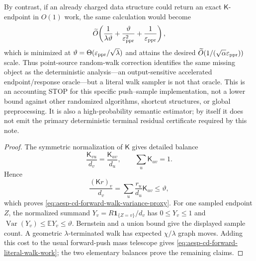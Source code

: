 \begin{proposition}
By contrast, if an already charged data structure could return an exact
\(\mathsf K\)-endpoint in \(O(1)\) work, the same calculation would become
\begin{equation*}
 \widetilde O\!\left(
   \frac1{\lambda\vartheta}
  +\frac{\vartheta}{\varepsilon_{\mathrm{ppr}}^2}
  +\frac1{\varepsilon_{\mathrm{ppr}}}
 \right),
\end{equation*}
which is minimized at
\(\vartheta=\Theta(\varepsilon_{\mathrm{ppr}}/\sqrt\lambda)\) and attains the desired
\(\widetilde O(1/(\sqrt\alpha\varepsilon_{\mathrm{ppr}}))\) scale.  Thus point-source
random-walk correction identifies the same missing object as the deterministic
analysis---an output-sensitive accelerated endpoint/response oracle---but a
literal walk sampler is not that oracle.  This is an accounting STOP for this
specific push--sample implementation, not a lower bound against other
randomized algorithms, shortcut structures, or global preprocessing.  It is
also a high-probability semantic estimator; by itself it does not emit the
primary deterministic terminal residual certificate required by this note.
\end{proposition}

\begin{proof}
The symmetric normalization of \(\mathsf K\) gives detailed balance
\begin{equation*}
 \frac{\mathsf K_{vu}}{d_v}=\frac{\mathsf K_{uv}}{d_u},
 \qquad
 \sum_u\mathsf K_{uv}=1.
\end{equation*}
Hence
\begin{equation*}
 \frac{(\mathsf K r)_v}{d_v}
 =\sum_u\frac{r_u}{d_u}\mathsf K_{uv}
 \leq\vartheta,
\end{equation*}
which proves \cref{eq:aesp-cd-forward-walk-variance-proxy}.  For one sampled
endpoint \(Z\), the normalized summand
\(Y_v=R\mathbf1_{\{Z=v\}}/d_v\) has
\(0\leq Y_v\leq1\) and
\(\operatorname{Var}(Y_v)\leq\mathbb E Y_v\leq\vartheta\).
Bernstein and a union bound give the displayed sample count.  A geometric
\(\lambda\)-terminated walk has expected \(\chi/\lambda\) graph moves.
Adding this cost to the usual forward-push mass telescope gives
\cref{eq:aesp-cd-forward-literal-walk-work}; the two elementary balances
prove the remaining claims.
\end{proof}

